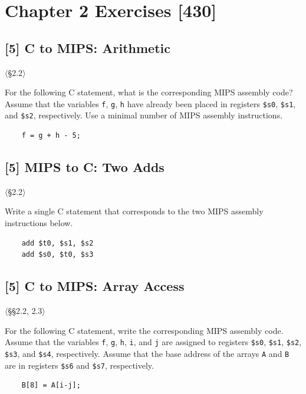 \newpage
\section{Chapter 2 Exercises [430]}

\subsection{[5] C to MIPS: Arithmetic}
\hypertarget{prob-2.1}{}
\noindent$\langle$\S2.2$\rangle$\medskip

\noindent For the following C statement, what is the corresponding MIPS assembly
code? Assume that the variables \texttt{f}, \texttt{g}, \texttt{h} have
already been placed in registers \texttt{\$s0}, \texttt{\$s1}, and
\texttt{\$s2}, respectively. Use a minimal number of MIPS assembly
instructions.
\begin{verbatim}
    f = g + h - 5;
\end{verbatim}

\problembreak

\subsection{[5] MIPS to C: Two Adds}
\hypertarget{prob-2.2}{}
\noindent$\langle$\S2.2$\rangle$\medskip

\noindent Write a single C statement that corresponds to the two MIPS assembly
instructions below.
\begin{verbatim}
    add $t0, $s1, $s2
    add $s0, $t0, $s3
\end{verbatim}

\problembreak

\subsection{[5] C to MIPS: Array Access}
\hypertarget{prob-2.3}{}
\noindent$\langle$\S\S2.2, 2.3$\rangle$\medskip

\noindent For the following C statement, write the corresponding MIPS assembly
code. Assume that the variables \texttt{f}, \texttt{g}, \texttt{h},
\texttt{i}, and \texttt{j} are assigned to registers \texttt{\$s0},
\texttt{\$s1}, \texttt{\$s2}, \texttt{\$s3}, and \texttt{\$s4},
respectively. Assume that the base address of the arrays \texttt{A} and
\texttt{B} are in registers \texttt{\$s6} and \texttt{\$s7}, respectively.
\begin{verbatim}
    B[8] = A[i-j];
\end{verbatim}

